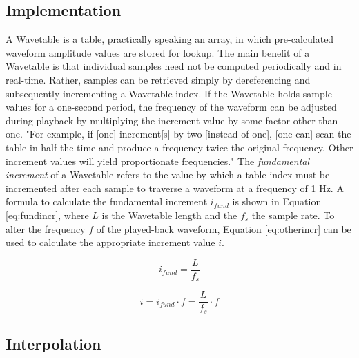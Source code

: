 \subsection{Implementation}

A Wavetable is a table, practically speaking an array, in which pre-calculated waveform amplitude values are stored for lookup. The main benefit of a Wavetable is that individual samples need not be computed periodically and in real-time. Rather, samples can be retrieved simply by dereferencing and subsequently incrementing a Wavetable index. If the Wavetable holds sample values for a one-second period, the frequency of the waveform can be adjusted during playback by multiplying the increment value by some factor other than one. "For example, if [one] increment[s] by two [instead of one], [one can] scan the table in half the time and produce a frequency twice the original frequency. Other increment values will yield proportionate frequencies."  The \emph{fundamental increment} of a Wavetable refers to the value by which a table index must be incremented after each sample to traverse a waveform at a frequency of 1 Hz. A formula to calculate the fundamental increment $i_{fund}$ is shown in Equation \ref{eq:fundincr}, where $L$ is the Wavetable length and the $f_{s}$ the sample rate. To alter the frequency $f$ of the played-back waveform, Equation \ref{eq:otherincr} can be used to calculate the appropriate increment value $i$.

\begin{equation}
  i_{fund} = \frac{L}{f_{s}}
  \label{eq:fundincr}
\end{equation}

\begin{equation}
  i = i_{fund} \cdot f = \frac{L}{f_{s}} \cdot f
  \label{eq:otherincr}
\end{equation}

\subsection{Interpolation}

